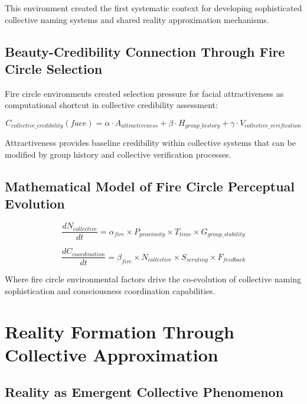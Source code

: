 \documentclass[12pt,a4paper]{article}
\begin{document}
This environment created the first systematic context for developing sophisticated collective naming systems and shared reality approximation mechanisms.

\subsection{Beauty-Credibility Connection Through Fire Circle Selection}

Fire circle environments created selection pressure for facial attractiveness as computational shortcut in collective credibility assessment:

\begin{equation}
C_{collective\_credibility}(face) = \alpha \cdot A_{attractiveness} + \beta \cdot H_{group\_history} + \gamma \cdot V_{collective\_verification}
\end{equation}

Attractiveness provides baseline credibility within collective systems that can be modified by group history and collective verification processes.

\subsection{Mathematical Model of Fire Circle Perceptual Evolution}

\begin{equation}
\frac{dN_{collective}}{dt} = \alpha_{fire} \times P_{proximity} \times T_{time} \times G_{group\_stability}
\end{equation}

\begin{equation}
\frac{dC_{coordination}}{dt} = \beta_{fire} \times N_{collective} \times S_{scrutiny} \times F_{feedback}
\end{equation}

Where fire circle environmental factors drive the co-evolution of collective naming sophistication and consciousness coordination capabilities.

\section{Reality Formation Through Collective Approximation}

\subsection{Reality as Emergent Collective Phenomenon}
\end{document}
